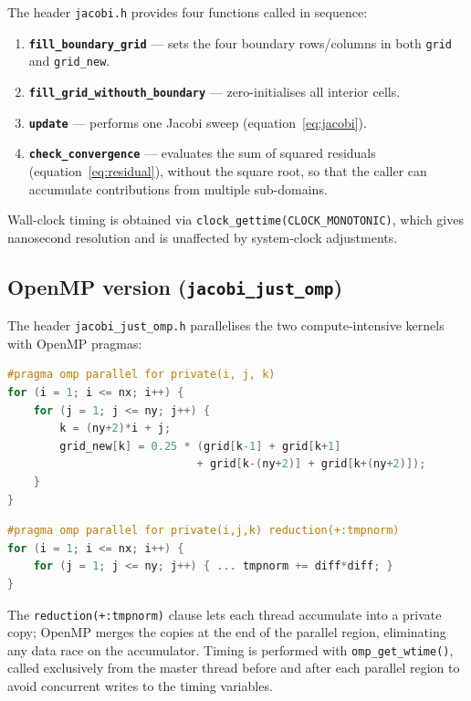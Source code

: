 \documentclass[11pt,a4paper]{article}
\begin{document}
The header \texttt{jacobi.h} provides four functions called in sequence:

\begin{enumerate}
  \item \textbf{\texttt{fill\_boundary\_grid}} --- sets the four boundary rows/columns
        in both \texttt{grid} and \texttt{grid\_new}.
  \item \textbf{\texttt{fill\_grid\_withouth\_boundary}} --- zero-initialises all
        interior cells.
  \item \textbf{\texttt{update}} --- performs one Jacobi sweep
        (equation~\eqref{eq:jacobi}).
  \item \textbf{\texttt{check\_convergence}} --- evaluates the sum of squared
        residuals (equation~\eqref{eq:residual}), without the square root, so
        that the caller can accumulate contributions from multiple sub-domains.
\end{enumerate}

Wall-clock timing is obtained via
\texttt{clock\_gettime(CLOCK\_MONOTONIC)}, which gives nanosecond resolution
and is unaffected by system-clock adjustments.

\subsection{OpenMP version (\texttt{jacobi\_just\_omp})}

The header \texttt{jacobi\_just\_omp.h} parallelises the two compute-intensive
kernels with OpenMP pragmas:

\begin{lstlisting}[language=C, caption={OpenMP loop parallelism in \texttt{update}.}]
#pragma omp parallel for private(i, j, k)
for (i = 1; i <= nx; i++) {
    for (j = 1; j <= ny; j++) {
        k = (ny+2)*i + j;
        grid_new[k] = 0.25 * (grid[k-1] + grid[k+1]
                             + grid[k-(ny+2)] + grid[k+(ny+2)]);
    }
}
\end{lstlisting}

\begin{lstlisting}[language=C, caption={Race-condition-safe reduction in \texttt{check\_convergence}.}]
#pragma omp parallel for private(i,j,k) reduction(+:tmpnorm)
for (i = 1; i <= nx; i++) {
    for (j = 1; j <= ny; j++) { ... tmpnorm += diff*diff; }
}
\end{lstlisting}

The \texttt{reduction(+:tmpnorm)} clause lets each thread accumulate into a
private copy; OpenMP merges the copies at the end of the parallel region,
eliminating any data race on the accumulator.
Timing is performed with \texttt{omp\_get\_wtime()}, called exclusively from the
master thread before and after each parallel region to avoid concurrent writes
to the timing variables.
\end{document}

